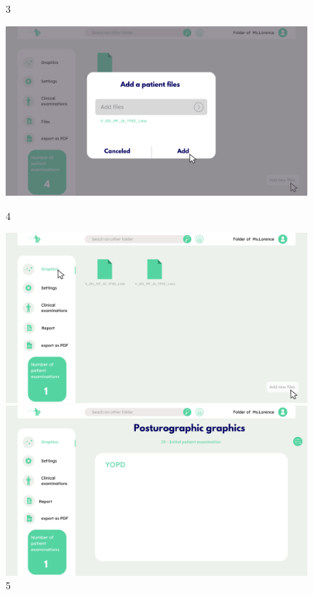 \begin{figure}[H]
\begin{minipage}{0.3\textwidth}
        \caption*{3}
    \end{minipage}
    \begin{minipage}{0.3\textwidth}
        \centering
        \includegraphics[width=\textwidth]{images/Prototype/4.png}
        \caption*{4}
    \end{minipage}
    \begin{minipage}{0.3\textwidth}
        \centering
        \includegraphics[width=\textwidth]{images/Prototype/5.png}
        \caption*{5}
    \end{minipage}
    \begin{minipage}{0.3\textwidth}
        \centering
        \includegraphics[width=\textwidth]{images/Prototype/6.png}

\end{minipage}
\end{figure}
